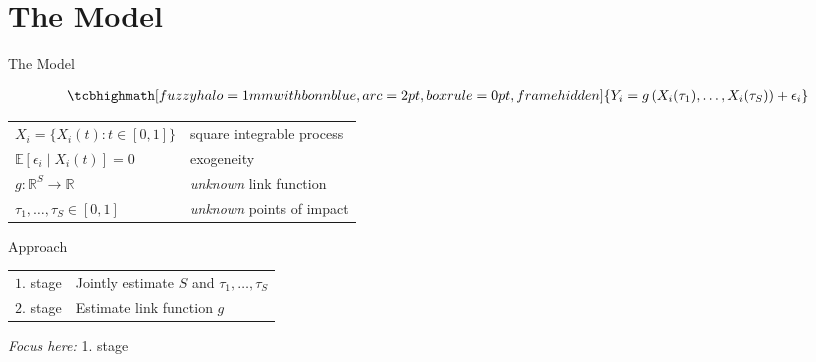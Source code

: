 \section{The Model}


\begin{frame}{The Model}

    \vspace{-1cm}
    \begin{align*}
        \tcbhighmath[fuzzy halo=1mm with bonnblue,arc=2pt, boxrule=0pt,frame
        hidden]{
            Y_i = g\left(X_i(\tau_1), \dots, X_i(\tau_S) \right) +  \epsilon_i
        }
    \end{align*}

    \vspace{0.5cm}
    \begin{table}[]
    \renewcommand{\arraystretch}{1.5}
        \begin{tabular}{ll}
           $X_i = \{ X_i(t) : t \in [0, 1]\}$ & square integrable process\\
           $\mathbb{E}\left[\epsilon_i \mid X_i(t) \right] = 0$ &  exogeneity\\
           $g : \mathbb{R}^S \to \mathbb{R}$ & \emph{unknown} link function \\
           $\tau_1, \dots, \tau_S \in [0, 1]$ &  \emph{unknown} points of impact
        \end{tabular}
    \end{table}

\end{frame}


\begin{frame}{Approach}

    \begin{table}[]
    \renewcommand{\arraystretch}{1.5}
        \begin{tabular}{ll}

            \textcolor{bonnblue}{$1$. stage} & Jointly estimate $S$ and $\tau_1, \dots,
            \tau_S$\\
            \textcolor{bonnblue}{$2$. stage} & Estimate link function $g$

        \end{tabular}
    \end{table}


    \vspace{1cm}
    \emph{Focus here:} 1. stage

\end{frame}
